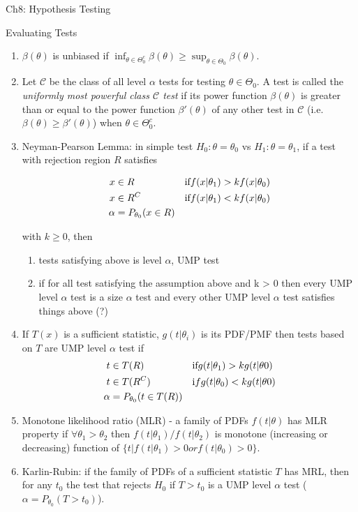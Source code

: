 \documentclass{article}
\begin{document}
\begin{section}{Ch8: Hypothesis Testing}
\begin{subsection}{Evaluating Tests}
\begin{enumerate}
\item $\beta(\theta)$ is unbiased if $\inf_{\theta \in \Theta_{0}^{c}} 
\beta(\theta) \geq \sup_{\theta \in \Theta_{0}} \beta(\theta)$.

\item Let $\mathcal{C}$ be the class of all level $\alpha$ tests for 
testing $\theta \in \Theta_{0}$. A test is called the \emph{uniformly most 
powerful class $\mathcal{C}$ test} if its power function $\beta(\theta)$ is 
greater than or equal to the power function $\beta'(\theta)$ of any other 
test in $\mathcal{C}$ (i.e. $\beta(\theta) \geq \beta'(\theta)$) when 
$\theta \in \Theta_{0}^{c}$.

\item Neyman-Pearson Lemma: in simple test $H_{0}: \theta = \theta_{0}$ vs
$H_{1}: \theta = \theta_{1}$, if a test with rejection region $R$ satisfies

  \begin{align}
  x & \in R && \text{if} f(x|\theta_{1}) > k f(x|\theta_{0}) \notag\\
  x & \in R^{C} && \text {if} f(x|\theta_{1}) < k f(x|\theta_{0}) \notag\\
  \alpha & = P_{\theta_{0}}(x \in R) \notag
  \end{align}

\noindent with $k \geq 0$, then 
  \begin{enumerate}
  \item tests satisfying above is level $\alpha$, UMP test
  \item if for all test satisfying the assumption above and k > 0 then every
    UMP level $\alpha$ test is a size $\alpha$ test and every other UMP
    level $\alpha$ test satisfies things above (?)
  \end{enumerate}

\item If $T(x)$ is a sufficient statistic, $g(t|\theta_{i})$ is its PDF/PMF
then tests based on $T$ are UMP level $\alpha$ test if
  \begin{align}
  t & \in T(R) && \text{if} g(t|\theta_{1}) > k g(t|\theta{0}) \notag\\
  t & \in T(R^{C}) && \text if g(t|\theta_{0}) < k g(t|\theta{0}) \notag\\
  \alpha & = P_{\theta_{0}}(t \in T(R)) \notag
  \end{align}

\item Monotone likelihood ratio (MLR) - a family of PDFs $f(t|\theta)$ has
MLR property if $\forall \theta_{1} > \theta_{2}$ then 
$f(t|\theta_{1}) / f(t|\theta_{2})$ is monotone (increasing or decreasing)
function of $\{t | f(t|\theta_{1}) > 0 or f(t|\theta_{0}) > 0 \}$.

\item Karlin-Rubin: if the family of PDFs of a sufficient statistic $T$
has MRL, then for any $t_{0}$ the test that rejects $H_{0}$ if $T > t_{0}$
is a UMP level $\alpha$ test ($\alpha = P_{\theta_{0}}(T > t_{0})$).
\end{enumerate}
\end{subsection}
\end{section}
\end{document}
